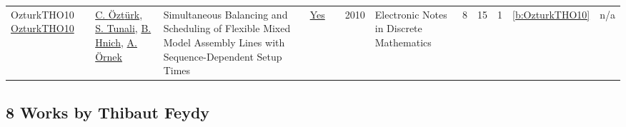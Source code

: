 {\begin{longtable}{>{\raggedright\arraybackslash}p{3cm}>{\raggedright\arraybackslash}p{6cm}>{\raggedright\arraybackslash}p{6.5cm}rrrp{2.5cm}rrrrr}
OzturkTHO10 \href{https://www.sciencedirect.com/science/article/pii/S1571065310000107}{OzturkTHO10} & \hyperref[auth:a136]{C. {\"{O}}zt{\"{u}}rk}, \hyperref[auth:a137]{S. Tunali}, \hyperref[auth:a138]{B. Hnich}, \hyperref[auth:a139]{A. {\"{O}}rnek} & Simultaneous Balancing and Scheduling of Flexible Mixed Model Assembly Lines with Sequence-Dependent Setup Times & \href{../works/OzturkTHO10.pdf}{Yes} & \cite{OzturkTHO10} & 2010 & Electronic Notes in Discrete Mathematics & 8 & 15 & 1 & \ref{b:OzturkTHO10} & n/a\\
\end{longtable}
}

\clearpage
\subsection{8 Works by Thibaut Feydy}
\label{sec:a155}
